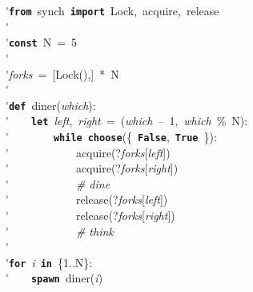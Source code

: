 \'\>\texttt{\textbf{from}}~synch~\texttt{\textbf{import}}~Lock,~acquire,~release\\

\'\>\\

\'\>\texttt{\textbf{const}}~N~=~5\\

\'\>\\

\'\>\textit{forks}~=~[Lock(),]~*~N\\

\'\>\\

\'\>\texttt{\textbf{def}}~diner(\textit{which}):\\

\'\>~~~~\texttt{\textbf{let}}~\textit{left},~\textit{right}~=~(\textit{which}~--~1,~\textit{which}~\%~N):\\

\'\>~~~~~~~~\texttt{\textbf{while}}~\texttt{\textbf{choose}}(\{~\texttt{\textbf{False}},~\texttt{\textbf{True}}~\}):\\

\'\>~~~~~~~~~~~~acquire(?\textit{forks}[\textit{left}])\\

\'\>~~~~~~~~~~~~acquire(?\textit{forks}[\textit{right}])\\

\'\>~~~~~~~~~~~~\emph{\# dine}\\

\'\>~~~~~~~~~~~~release(?\textit{forks}[\textit{left}])\\

\'\>~~~~~~~~~~~~release(?\textit{forks}[\textit{right}])\\

\'\>~~~~~~~~~~~~\emph{\# think}\\

\'\>\\

\'\>\texttt{\textbf{for}}~\textit{i}~\texttt{\textbf{in}}~\{1..N\}:\\

\'\>~~~~\texttt{\textbf{spawn}}~diner(\textit{i})